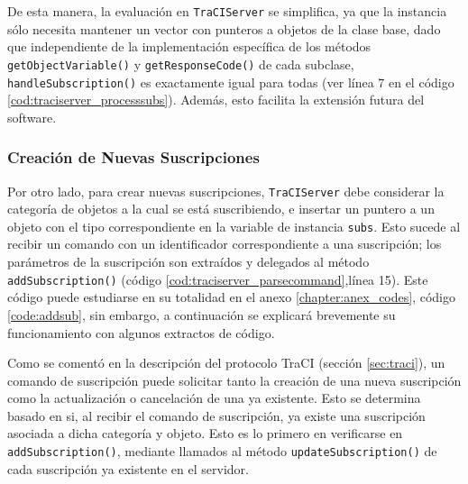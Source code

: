 %


%

De esta manera, la evaluación en \texttt{TraCIServer} se simplifica, ya que la instancia sólo necesita mantener un vector con punteros a objetos de la clase base, dado que independiente de la implementación específica de los métodos \texttt{getObjectVariable()} y \texttt{getResponseCode()} de cada subclase, \texttt{handleSubscription()} es exactamente igual para todas (ver línea 7 en el código \ref{cod:traciserver_processsubs}). Además, esto facilita la extensión futura del software.



\subsubsection{Creación de Nuevas Suscripciones}

Por otro lado, para crear nuevas suscripciones, \texttt{TraCIServer} debe considerar la categoría de objetos a la cual se está suscribiendo, e insertar un puntero a un objeto con el tipo correspondiente en la variable de instancia \texttt{subs}. Esto sucede al recibir un comando con un identificador correspondiente a una suscripción; los parámetros de la suscripción son extraídos y delegados al método \texttt{addSubscription()} (código \ref{cod:traciserver_parsecommand},línea 15). Este código puede estudiarse en su totalidad en el anexo \ref{chapter:anex_codes}, código \ref{code:addsub}, sin embargo, a continuación se explicará brevemente su funcionamiento con algunos extractos de código.

Como se comentó en la descripción del protocolo TraCI (sección \ref{sec:traci}), un comando de suscripción puede solicitar tanto la creación de una nueva suscripción como la actualización o cancelación de una ya existente. Esto se determina basado en si, al recibir el comando de suscripción, ya existe una suscripción asociada a dicha categoría y objeto. Esto es lo primero en verificarse en \texttt{addSubscription()}, mediante llamados al método \texttt{updateSubscription()} de cada suscripción ya existente en el servidor.

